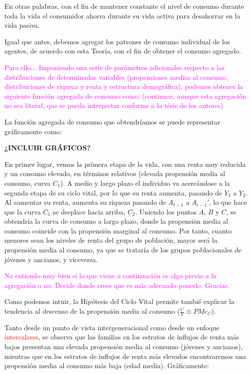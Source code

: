 \documentclass[10pt,a4paper]{article}
\begin{document}
En otras palabras, con el fin de mantener constante el nivel de consumo durante toda la vida el consumidor ahorra durante su vida activa para desahorrar en la vida pasiva. 

Igual que antes, debemos agregar los patrones de consumo individual de los agentes, de acuerdo con esta Teoría, con el fin de obtener el consumo agregado. 

\textcolor{magenta}{Para ello... Imponiendo una serie de parámetros adicionales respecto a las distribuciones de determinadas variables (propensiones medias al consumo, distribuciones de riqueza y renta y estructura demográfica), podemos obtener la siguiente función agregada de consumo como: (continuar, aunque esta agregación no sea literal, que se pueda interpretar conforme a la tésis de los autores)}


La función agregada de consumo que obtendríamos se puede representar gráficamente como:

\textbf{¿INCLUIR GRÁFICOS?}

En primer lugar, vemos la primera etapa de la vida, con una renta muy reducida y un consumo elevado, en términos relativos (elevada propensión media al consumo, curva $C_1$). A medio y largo plazo el individuo va acercándose a la segunda etapa de su ciclo vital, por lo que su renta aumenta, pasando de $Y_1$ a $Y_2$. Al aumentar su renta, aumenta su riqueza pasando de $A_{t-1}$ a $A_{t-1}'$, lo que hace que la curva $C_1$ se desplace hacia arriba, $C_2$. Uniendo los puntos $A$, $B$ y $C$, se obtendría la curva de consumo a largo plazo, donde la propensión media al consumo coincide con la propensión marginal al consumo. Por tanto, cuanto menores sean los niveles de renta del grupo de población, mayor será la propensión media al consumo, ya que se trataría de los grupos poblacionales de jóvenes y ancianos; y viceversa.

\textcolor{magenta}{No entiendo muy bien si lo que viene a continuación es algo previo a la agregación o no. Decide donde crees que es más adecuado ponerlo. Gracias.}

Como podemos intuir, la Hipótesis del Ciclo Vital permite tambié explicar la tendencia al descenso de la propensión media al consumo ($\frac{C}{Y}\equiv PMe_C$). 

Tanto desde un punto de vista intergeneracional como desde un enfoque \textcolor{red}{intercalases}, se observa que las familias en los estratos de influjos de renta más bajos presentan una elevada propensión media al consumo (jóvenes y ancianos), mientras que en los estratos de influjos de renta más elevados encontraremos una propensión media al consumo más baja (edad media). Gráficamente:
\end{document}
